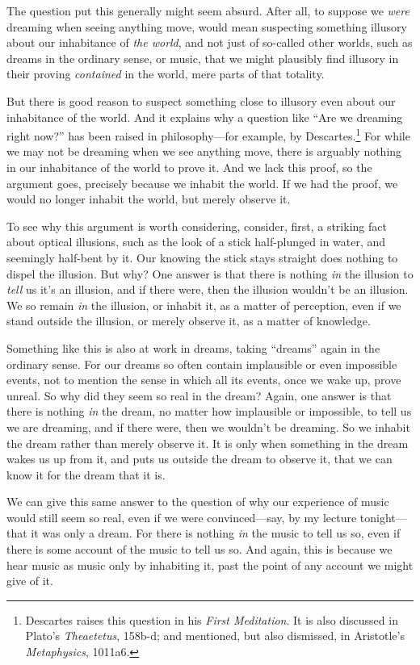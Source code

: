 \documentclass[12pt]{memoir}
\begin{document}
The question put this generally might seem absurd. After all, to suppose
we \emph{were} dreaming when seeing anything move, would mean suspecting
something illusory about our inhabitance of \emph{the world}, and not
just of so-called other worlds, such as dreams in the ordinary sense, or
music, that we might plausibly find illusory in their proving
\emph{contained} in the world, mere parts of that totality.

But there is good reason to suspect something
close to illusory even about our inhabitance
of the world. And it explains why a question
like ``Are we dreaming right now?'' has
been raised in philosophy---for example, by
Descartes.\footnote{Descartes raises this question
in his \emph{First Meditation}. It is also
discussed in Plato's \emph{Theaetetus}, 158b-d;
and mentioned, but also dismissed, in Aristotle's
\emph{Metaphysics}, 1011a6.} For while we may
not be dreaming when we see anything move, there
is arguably nothing in our inhabitance of the
world to prove it. And we lack this proof, so the
argument goes, precisely because we inhabit the
world. If we had the proof, we would no longer
inhabit the world, but merely observe it.

To see why this argument is worth considering,
consider, first, a striking fact about optical
illusions, such as the look of a stick
half-plunged in water, and seemingly half-bent
by it. Our knowing the stick stays straight does
nothing to dispel the illusion. But why? One
answer is that there is nothing \emph{in} the
illusion to \emph{tell} us it's an illusion, and
if there were, then the illusion wouldn't be an
illusion. We so remain \emph{in} the illusion, or
inhabit it, as a matter of perception, even if we
stand outside the illusion, or merely observe it,
as a matter of knowledge.

Something like this is also at work in dreams, taking ``dreams'' again
in the ordinary sense. For our dreams so often contain implausible or
even impossible events, not to mention the sense in which all its
events, once we wake up, prove unreal. So why did they seem so real in
the dream? Again, one answer is that there is nothing \emph{in} the
dream, no matter how implausible or impossible, to tell us we are
dreaming, and if there were, then we wouldn't be dreaming. So we inhabit
the dream rather than merely observe it. It is only when something in
the dream wakes us up from it, and puts us outside the dream to observe
it, that we can know it for the dream that it is.

We can give this same answer to the question of why our experience of
music would still seem so real, even if we were convinced---say, by my
lecture tonight---that it was only a dream. For there is nothing
\emph{in} the music to tell us so, even if there is some account of the
music to tell us so. And again, this is because we hear music as music
only by inhabiting it, past the point of any account we might give of
it.
\end{document}
